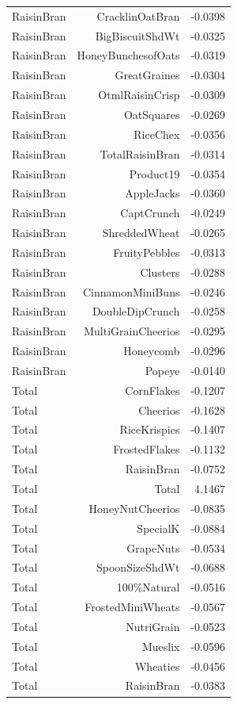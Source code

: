 \begin{longtable}{@{}lrr@{}}
RaisinBran & CracklinOatBran & -0.0398 \\
RaisinBran & BigBiscuitShdWt & -0.0325 \\
RaisinBran & HoneyBunchesofOats & -0.0319 \\
RaisinBran & GreatGraines & -0.0304 \\
RaisinBran & OtmlRaisinCrisp & -0.0309 \\
RaisinBran & OatSquares & -0.0269 \\
RaisinBran & RiceChex & -0.0356 \\
RaisinBran & TotalRaisinBran & -0.0314 \\
RaisinBran & Product19 & -0.0354 \\
RaisinBran & AppleJacks & -0.0360 \\
RaisinBran & CaptCrunch & -0.0249 \\
RaisinBran & ShreddedWheat & -0.0265 \\
RaisinBran & FruityPebbles & -0.0313 \\
RaisinBran & Clusters & -0.0288 \\
RaisinBran & CinnamonMiniBuns & -0.0246 \\
RaisinBran & DoubleDipCrunch & -0.0258 \\
RaisinBran & MultiGrainCheerios & -0.0295 \\
RaisinBran & Honeycomb & -0.0296 \\
RaisinBran & Popeye & -0.0140 \\
Total & CornFlakes & -0.1207 \\
Total & Cheerios & -0.1628 \\
Total & RiceKrispies & -0.1407 \\
Total & FrostedFlakes & -0.1132 \\
Total & RaisinBran & -0.0752 \\
Total & Total & 4.1467 \\
Total & HoneyNutCheerios & -0.0835 \\
Total & SpecialK & -0.0884 \\
Total & GrapeNuts & -0.0534 \\
Total & SpoonSizeShdWt & -0.0688 \\
Total & 100\%Natural & -0.0516 \\
Total & FrostedMiniWheats & -0.0567 \\
Total & NutriGrain & -0.0523 \\
Total & Mueslix & -0.0596 \\
Total & Wheaties & -0.0456 \\
Total & RaisinBran & -0.0383 \\

\end{longtable}
